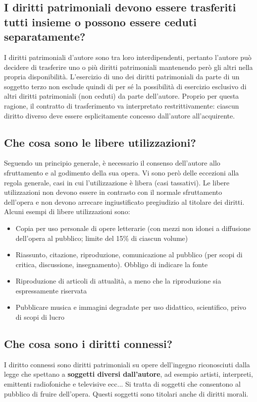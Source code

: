 \subsection{I diritti patrimoniali devono essere trasferiti tutti insieme o possono essere ceduti separatamente?}
I diritti patrimoniali d’autore sono tra loro interdipendenti, pertanto l’autore può decidere di trasferire uno
o più diritti patrimoniali mantenendo però gli altri nella propria disponibilità. L’esercizio di uno dei diritti patrimoniali
da parte di un soggetto terzo non esclude quindi di per sé la possibilità di esercizio esclusivo di altri diritti
patrimoniali (non ceduti) da parte dell’autore. Proprio per questa ragione, il contratto di trasferimento va interpretato
restrittivamente: ciascun diritto diverso deve essere esplicitamente concesso dall’autore all’acquirente.

\subsection{Che cosa sono le libere utilizzazioni?}
Seguendo un principio generale, è necessario il consenso dell'autore allo sfruttamento e al godimento della sua opera. \newline
Vi sono però delle eccezioni alla regola generale, casi in cui l'utilizzazione è libera (casi tassativi).\newline
Le libere utilizzazioni non devono essere in contrasto con il normale sfruttamento dell'opera e non devono arrecare
ingiustificato pregiudizio al titolare dei diritti.\newline
Alcuni esempi di libere utilizzazioni sono:
\begin{itemize}
    \item Copia per uso personale di opere letterarie (con mezzi non idonei a diffusione dell'opera al pubblico;
    limite del 15\% di ciascun volume)
    \item Riassunto, citazione, riproduzione, comunicazione al pubblico (per scopi di critica, discussione, insegnamento).
    Obbligo di indicare la fonte
    \item Riproduzione di articoli di attualità, a meno che la riproduzione sia espressamente riservata
    \item Pubblicare musica e immagini degradate per uso didattico, scientifico, privo di scopi di lucro
\end{itemize}

\subsection{Che cosa sono i diritti connessi?}
I diritto connessi sono diritti patrimoniali su opere dell'ingegno riconosciuti dalla legge che spettano a \textbf{soggetti diversi
dall'autore}, ad esempio artisti, interpreti, emittenti radiofoniche e televisive ecc... \newline
Si tratta di soggetti che consentono al pubblico di fruire dell'opera. Questi soggetti sono titolari anche di diritti morali.

